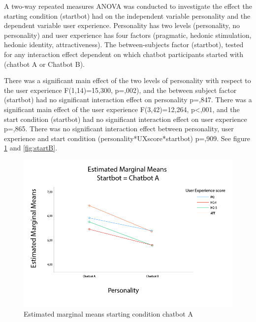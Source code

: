 A two-way repeated measures ANOVA was conducted to investigate the effect the starting condition (startbot) had on the independent variable personality and the dependent variable user experience. Personality has two levels (personality, no personality) and user experience has four factors (pragmatic, hedonic stimulation, hedonic identity, attractiveness). The between-subjects factor (startbot), tested for any interaction effect dependent on which chatbot participants started with (chatbot A or Chatbot B).

There was a significant main effect of the two levels of personality with respect to the user experience F(1,14)=15,300, p=,002), and the between subject factor (startbot) had no significant interaction effect on personality p=,847. There was a significant main effect of the user experience F(3,42)=12,264, p<,001, and the start condition (startbot) had no significant interaction effect on user experience p=,865. There was no significant interaction effect between personality, user experience and start condition (personality*UXscore*startbot) p=,909. See figure \ref{fig:startA} and \ref{fig:startB}.

\begin{figure}[h]
    \centering
    \includegraphics[scale=0.4]{figures/MMeanStartbotA.png}
    \caption{Estimated marginal means starting condition chatbot A}
    \label{fig:startA}
\end{figure}

